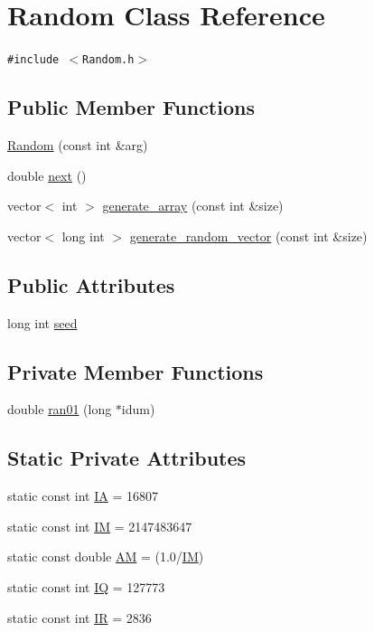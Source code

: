 \hypertarget{classRandom}{
\section{Random Class Reference}
\label{classRandom}
}
{\tt \#include $<$Random.h$>$}

\subsection*{Public Member Functions}
\begin{CompactItemize}
\item 
\hyperlink{classRandom_9a974d20ddfe8d3446b6c5caf1070fab}{Random} (const int \&arg)
\item 
double \hyperlink{classRandom_496fd24cf56a81dc0e0e35bc89e22dd4}{next} ()
\item 
vector$<$ int $>$ \hyperlink{classRandom_d910cd5ff76a472b480f7917fbd7731c}{generate\_\-array} (const int \&size)
\item 
vector$<$ long int $>$ \hyperlink{classRandom_cc60a9ae73a1d6f8bd85211253228d7d}{generate\_\-random\_\-vector} (const int \&size)
\end{CompactItemize}
\subsection*{Public Attributes}
\begin{CompactItemize}
\item 
long int \hyperlink{classRandom_b5bc0589111c5d5198e82cffde01964b}{seed}
\end{CompactItemize}
\subsection*{Private Member Functions}
\begin{CompactItemize}
\item 
double \hyperlink{classRandom_edbbb92c4f516da86f3546021267b7b0}{ran01} (long $\ast$idum)
\end{CompactItemize}
\subsection*{Static Private Attributes}
\begin{CompactItemize}
\item 
static const int \hyperlink{classRandom_d46d9384a3a1d20b9aa4d2476c274993}{IA} = 16807
\item 
static const int \hyperlink{classRandom_951998ee091a5acf5337e1c215e66f6e}{IM} = 2147483647
\item 
static const double \hyperlink{classRandom_12ab86946d6892b1bbca4640314c4836}{AM} = (1.0/\hyperlink{classRandom_951998ee091a5acf5337e1c215e66f6e}{IM})
\item 
static const int \hyperlink{classRandom_7792314b78dc687dfd6a7b511d937c75}{IQ} = 127773
\item 
static const int \hyperlink{classRandom_8c7d5f7cf040525a9111fa69b1d35a38}{IR} = 2836
\end{CompactItemize}


